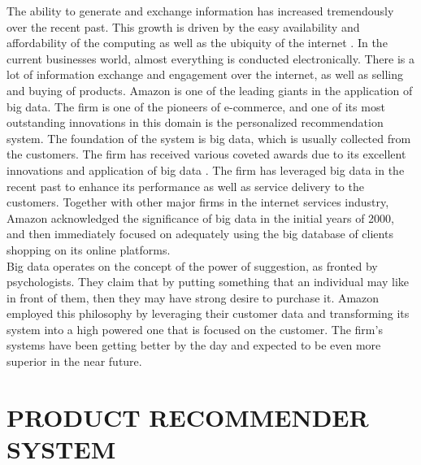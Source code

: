 \documentclass[sigconf]{acmart}
\begin{document}
The ability to generate and exchange information has increased tremendously over the recent past. This growth is driven by the easy availability and affordability of the computing as well as the ubiquity of the internet \cite{BergerandDoban2014}. In the current businesses world, almost everything is conducted electronically. There is a lot of information exchange and engagement over the internet, as well as selling and buying of products. Amazon is one of the leading giants in the application of big data. The firm is one of the pioneers of e-commerce, and one of its most outstanding innovations in this domain is the personalized recommendation system. The foundation of the system is big data, which is usually collected from the customers.  The firm has received various coveted awards due to its excellent innovations and application of big data \cite{BergerandDoban2014}. The firm has leveraged big data in the recent past to enhance its performance as well as service delivery to the customers. Together with other major firms in the internet services industry, Amazon acknowledged the significance of big data in the initial years of 2000, and then immediately focused on adequately using the big database of clients shopping on its online platforms. \\
Big data operates on the concept of the power of suggestion, as fronted by psychologists. They claim that by putting something that an individual may like in front of them, then they may have strong desire to purchase it. Amazon employed this philosophy by leveraging their customer data and transforming its system into a high powered one that is focused on the customer. The firm’s systems have been getting better by the day and expected to be even more superior in the near future.

\section{PRODUCT RECOMMENDER SYSTEM}
\end{document}
